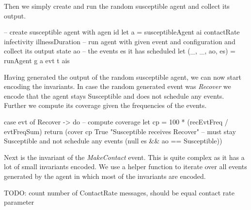 Then we simply create and run the random susceptible agent and collect its output.

\begin{HaskellCode}
-- create susceptible agent with agen id
let a = susceptibleAgent ai contactRate infectivity illnessDuration
-- run agent with given event and configuration and collect its output state ao
-- the events es it has scheduled
let (_, _, ao, es) = runAgent g a evt t ais
\end{HaskellCode}

Having generated the output of the random susceptible agent, we can now start encoding the invariants. In case the random generated event was \textit{Recover} we encode that the agent stays Susceptible and does not schedule any events. Further we compute its coverage given the frequencies of the events.

\begin{HaskellCode}
case evt of
  Recover -> do
    -- compute coverage
    let cp = 100 * (recEvtFreq / evtFreqSum)
    return (cover cp True "Susceptible receives Recover"
           -- must stay Susceptible and not schedule any events
           (null es && ao == Susceptible))
\end{HaskellCode}

Next is the invariant of the \textit{MakeContact} event. This is quite complex as it has a lot of small invariants encoded. We use a helper function to iterate over all events generated by the agent in which most of the invariants are encoded.

TODO: count number of ContactRate messages, should be equal contact rate parameter

